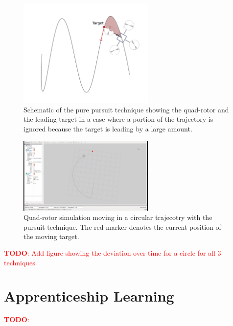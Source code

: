 \documentclass[BTech]{iitmdiss}
\newcommand\todo[1]{\textcolor{red}{{\bf TODO}: #1}}
\begin{document}
\begin{figure}[h]
  \centering
    \includegraphics[width=0.6\textwidth]{pursuit_con.png}
    \caption{Schematic of the pure pursuit technique showing the quad-rotor and the leading target in a case where a portion of the trajectory is ignored because the target is leading by a large amount.}
\end{figure}

\begin{figure}[h]
  \centering
    \includegraphics[width=0.6\textwidth]{pursuit_circle.png}
    \caption{Quad-rotor simulation moving in a circular trajecotry with the pursuit technique. The red marker denotes the current position of the moving target.}
\end{figure}

\todo{Add figure showing the deviation over time for a circle for all 3 techniques}

\chapter{Apprenticeship Learning}

\todo{}

\begin{singlespace}
  
\end{singlespace}
\end{document}
